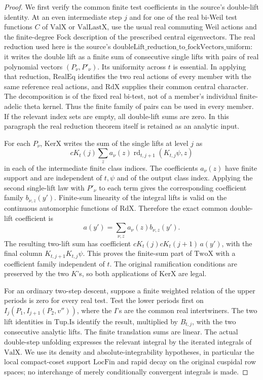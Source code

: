 \begin{proof}
We first verify the common finite test coefficients in the source's
double-lift identity. At an even intermediate step \(j\) and for one
of the real bi-Weil test functions \(C\) of \(\mathrm{ValX}\) or
\(\mathrm{ValLastX}\), use the usual real commuting Weil actions
and the finite-degree Fock description of the prescribed central
eigenvectors. The real reduction used here is the source's
\(\mathrm{doubleLift\_reduction\_to\_fockVectors\_uniform}\):
it writes the double lift as a finite sum of consecutive single
lifts with pairs of real polynomial vectors \((P_\nu,P'_\nu)\).
Its uniformity across \(t\) is essential. In applying that
reduction, \(\mathrm{RealEq}\) identifies the two real actions of
every member with the same reference real actions, and
\(\mathrm{RdX}\) supplies their common central character. The
decomposition is of the fixed real bi-test, not of a member's
individual finite-adelic theta kernel. Thus the finite family of
pairs can be used in every member. If the relevant index sets
are empty, all double-lift sums are zero. In this paragraph the
real reduction theorem itself is retained as an analytic input.

For each \(P_\nu\), \(\mathrm{KerX}\) writes the sum of the
single lifts at level \(j\) as
\[
 cK_t(j)\sum_{z}a_\nu(z)
       \operatorname{rd}_{t,j+1}(K_{t,j}\psi,z)
\]
in each of the intermediate finite class indices.
The coefficients \(a_\nu(z)\) have finite support and are
independent of \(t,\psi\) and of the output class index.
Applying the second single-lift law with \(P'_\nu\) to each term
gives the corresponding coefficient family \(b_{\nu,z}(y')\).
Finite-sum linearity of the integral lifts is valid on the
continuous automorphic functions of \(\mathrm{RdX}\).
Therefore the exact common double-lift coefficient is
\[
 a(y')=\sum_{\nu,z}a_\nu(z)b_{\nu,z}(y').
 \tag{RT4}
\]
The resulting two-lift sum has coefficient
\(cK_t(j)cK_t(j+1)\,a(y')\), with the final column
\(K_{t,j+1}K_{t,j}\psi\). This proves the finite-sum part of
\(\mathrm{TwoX}\) with a coefficient family independent of \(t\).
The original ramification conditions are preserved by the two
\(K\)'s, so both applications of \(\mathrm{KerX}\) are legal.

For an ordinary two-step descent, suppose a finite weighted
relation of the upper periods is zero for every real test.
Test the lower periods first on
\(I_j(P_1,I_{j+1}(P_2,v''))\), where the \(I\)'s are the common
real intertwiners. The two lift identities in \(\mathrm{Tup.Is}\)
identify the result, multiplied by \(B_{t,j}\), with the two
consecutive analytic lifts. The finite translation sums are
linear. The actual double-step unfolding expresses the
relevant integral by the iterated integrals of
\(\mathrm{ValX}\). We use its density and absolute-integrability
hypotheses, in particular the local compact-coset support
\(\mathrm{LocFin}\) and rapid decay on the original cuspidal
row spaces; no interchange of merely conditionally convergent
integrals is made.


\end{proof}
